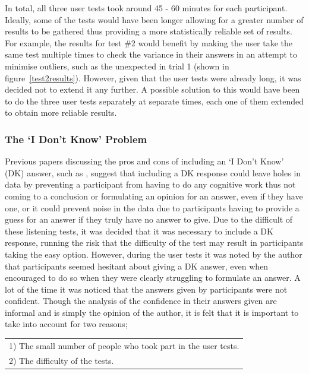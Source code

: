 \documentclass[../../main.tex]{subfiles}
\begin{document}
				In total, all three user tests took around 45 - 60 minutes for each participant. Ideally, some of the tests would have been longer allowing for a greater number of results to be gathered thus providing a more statistically reliable set of results. For example, the results for test \#2 would benefit by making the user take the same test multiple times to check the variance in their answers in an attempt to minimise outliers, such as the unexpected in trial 1 (shown in figure~\ref{test2results}). However, given that the user tests were already long, it was decided not to extend it any further. A possible solution to this would have been to do the three user tests separately at separate times, each one of them extended to obtain more reliable results.


			\subsubsection{The `I Don't Know' Problem}
				Previous papers discussing the pros and cons of including an `I Don't Know' (DK) answer, such as \cite{DK}, suggest that including a DK response could leave holes in data by preventing a participant from having to do any cognitive work thus not coming to a conclusion or formulating an opinion for an answer, even if they have one, or it could prevent noise in the data due to participants having to provide a guess for an answer if they truly have no answer to give. Due to the difficult of these listening tests, it was decided that it was necessary to include a DK response, running the risk that the difficulty of the test may result in participants taking the easy option. However, during the user tests it was noted by the author that participants seemed hesitant about giving a DK answer, even when encouraged to do so when they were clearly struggling to formulate an answer. A lot of the time it was noticed that the answers given by participants were not confident. Though the analysis of the confidence in their answers given are informal and is simply the opinion of the author, it is felt that it is important to take into account for two reasons;

				\vspace{2mm}
				\begin{tabular}{l}
				1) The small number of people who took part in the user tests.\\
				2) The difficulty of the tests.
				\end{tabular}
				\vspace{2mm}
\end{document}
